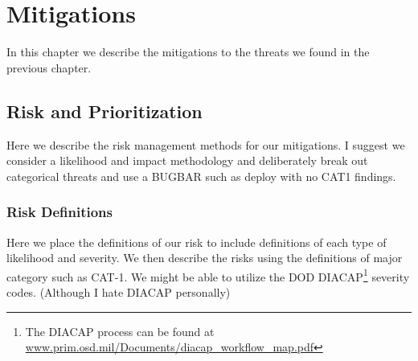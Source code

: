 \chapter{Mitigations}
\label{ch:mitigations}
In this chapter we describe the mitigations to the threats we found in
the previous chapter.

\section{Risk and Prioritization}
\label{sec:risk}
Here we describe the risk management methods for our mitigations. I
suggest we consider a likelihood and impact methodology and
deliberately break out categorical threats and use a BUGBAR such as
deploy with no CAT1 findings.

\subsection{Risk Definitions}
Here we place the definitions of our risk to include definitions of
each type of likelihood and severity.  We then describe the risks
using the definitions of major category such as CAT-1.  We might be
able to utilize the DOD DIACAP\footnote{The DIACAP process can be
found at \url{www.prim.osd.mil/Documents/diacap_workflow_map.pdf}}
severity codes.  (Although I hate DIACAP personally)
